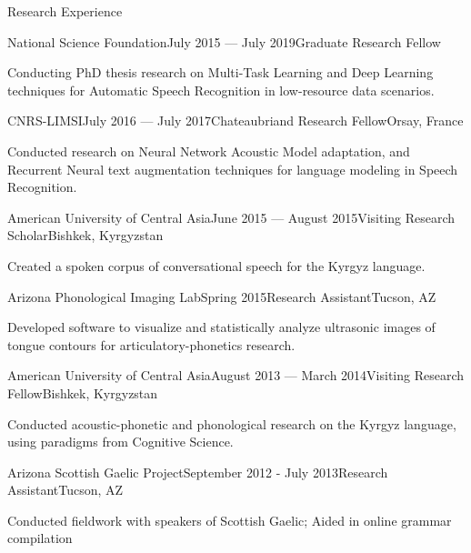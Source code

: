 \documentclass{resume} %
\begin{document}
\begin{rSection}{Research Experience}

\begin{rSubsection}{National Science Foundation}{July 2015 --- July 2019}{Graduate Research Fellow}{}
\item Conducting PhD thesis research on Multi-Task Learning and Deep Learning techniques for Automatic Speech Recognition in low-resource data scenarios.
\end{rSubsection}


\begin{rSubsection}{CNRS-LIMSI}{July 2016 --- July 2017}{Chateaubriand Research Fellow}{Orsay, France}
\item Conducted research on Neural Network Acoustic Model adaptation, and Recurrent Neural text augmentation techniques for language modeling in Speech Recognition.
\end{rSubsection}

\begin{rSubsection}{American University of Central Asia}{June 2015 --- August 2015}{Visiting Research Scholar}{Bishkek, Kyrgyzstan}
\item Created a spoken corpus of conversational speech for the Kyrgyz language.
\end{rSubsection}

\begin{rSubsection}{Arizona Phonological Imaging Lab}{Spring 2015}{Research Assistant}{Tucson, AZ}
\item Developed software to visualize and statistically analyze ultrasonic images of tongue contours for articulatory-phonetics research.
\end{rSubsection}

\begin{rSubsection}{American University of Central Asia}{August 2013 --- March 2014}{Visiting Research Fellow}{Bishkek, Kyrgyzstan}
\item Conducted acoustic-phonetic and phonological research on the Kyrgyz language, using paradigms from Cognitive Science.
\end{rSubsection}

\begin{rSubsection}{Arizona Scottish Gaelic Project}{September 2012 - July 2013}{Research Assistant}{Tucson, AZ}
\item Conducted fieldwork with speakers of Scottish Gaelic; Aided in online grammar compilation
\end{rSubsection}


\end{rSection}
\end{document}
